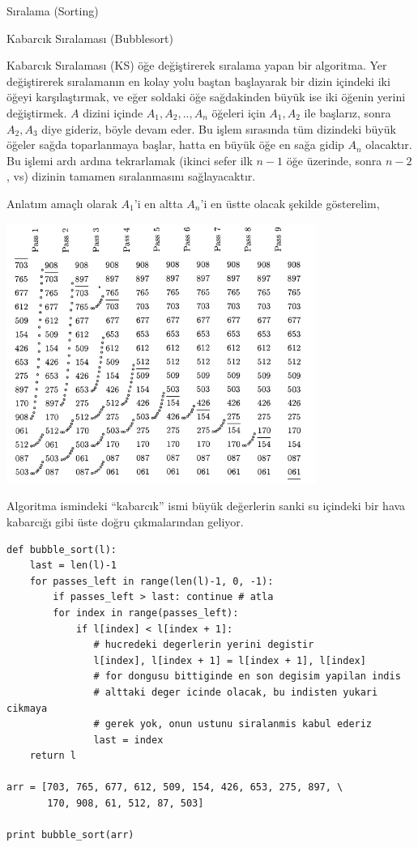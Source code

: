 \documentclass[12pt,fleqn]{article}\usepackage{../../common}
\begin{document}
Sıralama (Sorting)

Kabarcık Sıralaması (Bubblesort)

Kabarcık Sıralaması (KS) öğe değiştirerek sıralama yapan bir algoritma. Yer
değiştirerek sıralamanın en kolay yolu baştan başlayarak bir dizin içindeki iki
öğeyi karşılaştırmak, ve eğer soldaki öğe sağdakinden büyük ise iki öğenin
yerini değiştirmek. $A$ dizini içinde $A_1,A_2,..,A_n$ öğeleri için $A_1,A_2$
ile başlarız, sonra $A_2,A_3$ diye gideriz, böyle devam eder. Bu işlem sırasında
tüm dizindeki büyük öğeler sağda toparlanmaya başlar, hatta en büyük öğe en sağa
gidip $A_n$ olacaktır. Bu işlemi ardı ardına tekrarlamak (ikinci sefer ilk $n-1$
öğe üzerinde, sonra $n-2$, vs) dizinin tamamen sıralanmasını sağlayacaktır.

Anlatım amaçlı olarak $A_1$'i en altta $A_n$'i en üstte olacak şekilde
gösterelim,

\includegraphics[height=8.5cm]{sort_02.png}

Algoritma ismindeki ``kabarcık'' ismi büyük değerlerin sanki su içindeki bir
hava kabarcığı gibi üste doğru çıkmalarından geliyor.

\begin{verbatim}
def bubble_sort(l):
    last = len(l)-1  
    for passes_left in range(len(l)-1, 0, -1):
        if passes_left > last: continue # atla
        for index in range(passes_left):
            if l[index] < l[index + 1]:
               # hucredeki degerlerin yerini degistir
               l[index], l[index + 1] = l[index + 1], l[index]
               # for dongusu bittiginde en son degisim yapilan indis
               # alttaki deger icinde olacak, bu indisten yukari cikmaya
               # gerek yok, onun ustunu siralanmis kabul ederiz
               last = index        
    return l

arr = [703, 765, 677, 612, 509, 154, 426, 653, 275, 897, \
       170, 908, 61, 512, 87, 503]

print bubble_sort(arr)
\end{verbatim}
\end{document}
